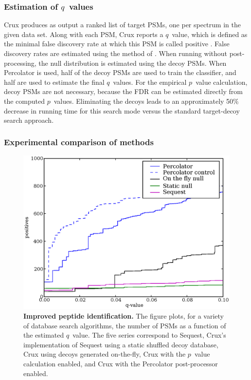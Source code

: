 \documentclass[12pt]{article}
\begin{document}
\subsubsection{Estimation of $q$~values}
\label{section:q-value}

Crux produces as output a ranked list of target PSMs, one per spectrum
in the given data set.  Along with each PSM, Crux reports a $q$~value,
which is defined as the minimal false discovery rate at which this PSM
is called positive \cite{storey:statistical, kall:assigning}.  False
discovery rates are estimated using the method of
\cite{benjamini:controlling}.  When running without post-processing,
the null distribution is estimated using the decoy PSMs.  When
Percolator is used, half of the decoy PSMs are used to train the
classifier, and half are used to estimate the final $q$~values.  For
the empirical $p$~value calculation, decoy PSMs are not necessary,
because the FDR can be estimated directly from the computed
$p$~values.  Eliminating the decoys leads to an approximately 50\%
decrease in running time for this search mode versus the standard
target-decoy search approach.

\subsubsection{Experimental comparison of methods}
\label{section:experimental}

\begin{figure}
\centering
\includegraphics[width=5in]{./Images/q-value.eps}
\caption{{\bf Improved peptide identification.}  The figure plots, for
  a variety of database search algorithms, the number of PSMs as a
  function of the estimated $q$~value.  The five series correspond to
  {\sc Sequest}, Crux's implementation of {\sc Sequest} using a static 
  shuffled decoy
  database, Crux using decoys generated on-the-fly, Crux with the
  $p$~value calculation enabled, and Crux with the
  Percolator post-processor enabled. 
  \label{figure:pq-plot}}
\end{figure}
\end{document}
